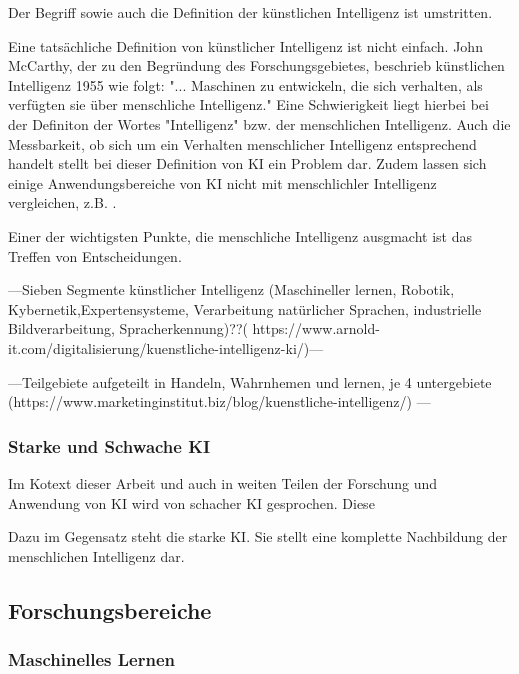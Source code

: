 \documentclass[a4paper,12pt, german]{report}
\begin{document}
Der Begriff sowie auch die Definition der künstlichen Intelligenz ist umstritten. 

Eine tatsächliche Definition von künstlicher Intelligenz ist nicht einfach. 
John McCarthy, der zu den Begründung des Forschungsgebietes, beschrieb künstlichen Intelligenz 1955 wie folgt: "... Maschinen zu entwickeln, die sich verhalten, als verfügten sie über menschliche Intelligenz."
Eine Schwierigkeit liegt hierbei bei der Definiton der Wortes "Intelligenz" bzw. der menschlichen Intelligenz. Auch die Messbarkeit, ob sich um ein Verhalten menschlicher Intelligenz entsprechend handelt stellt bei dieser Definition von KI ein Problem dar.
Zudem lassen sich einige Anwendungsbereiche von KI nicht mit menschlichler Intelligenz vergleichen, z.B. .

Einer der wichtigsten Punkte, die menschliche Intelligenz ausgmacht ist das Treffen von Entscheidungen. \cite{01} %

---Sieben Segmente künstlicher Intelligenz (Maschineller lernen, Robotik, Kybernetik,Expertensysteme, Verarbeitung natürlicher Sprachen, industrielle Bildverarbeitung, Spracherkennung)??( https://www.arnold-it.com/digitalisierung/kuenstliche-intelligenz-ki/)---

---Teilgebiete aufgeteilt in Handeln, Wahrnhemen und lernen, je 4 untergebiete (https://www.marketinginstitut.biz/blog/kuenstliche-intelligenz/) ---



\subsubsection{Starke und Schwache KI}

Im Kotext dieser Arbeit und auch in weiten Teilen der Forschung und Anwendung von KI wird von schacher KI gesprochen. Diese 

Dazu im Gegensatz steht die starke KI. Sie stellt eine komplette Nachbildung der menschlichen Intelligenz dar. 

\subsection{Forschungsbereiche}

\subsubsection{Maschinelles Lernen}
\end{document}
